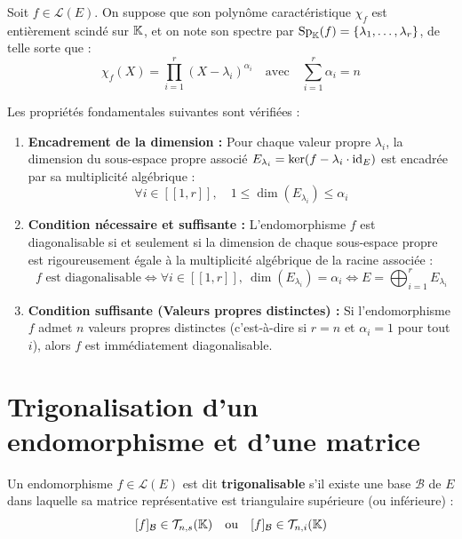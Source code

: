 \documentclass[12pt, a4paper]{report}
\begin{document}
\begin{theorem}
    Soit $f \in \mathcal{L}(E)$. On suppose que son polynôme caractéristique $\chi_f$ est entièrement scindé sur $\mathbb{K}$, et on note son spectre par $\text{Sp}_{\mathbb{K}}(f) = \{\lambda_1, \dots, \lambda_r\}$, de telle sorte que :
    $$\chi_f(X) = \prod_{i=1}^r (X - \lambda_i)^{\alpha_i} \quad \text{avec} \quad \sum_{i=1}^r \alpha_i = n$$
    
    Les propriétés fondamentales suivantes sont vérifiées :
    \begin{enumerate}
        \item \textbf{Encadrement de la dimension :} Pour chaque valeur propre $\lambda_i$, la dimension du sous-espace propre associé $E_{\lambda_i} = \ker(f - \lambda_i \cdot \mathrm{id}_E)$ est encadrée par sa multiplicité algébrique :
        $$\forall i \in [\![1,r]\!], \quad 1 \le \dim(E_{\lambda_i}) \le \alpha_i$$
        
        \item \textbf{Condition nécessaire et suffisante :} L'endomorphisme $f$ est diagonalisable si et seulement si la dimension de chaque sous-espace propre est rigoureusement égale à la multiplicité algébrique de la racine associée :
        $$f \text{ est diagonalisable} \iff \forall i \in [\![1,r]\!], \ \dim(E_{\lambda_i}) = \alpha_i \iff E = \bigoplus_{i=1}^r E_{\lambda_i}$$
        
        \item \textbf{Condition suffisante (Valeurs propres distinctes) :} Si l'endomorphisme $f$ admet $n$ valeurs propres distinctes (c'est-à-dire si $r = n$ et $\alpha_i = 1$ pour tout $i$), alors $f$ est immédiatement diagonalisable.
    \end{enumerate}
\end{theorem}

\section{Trigonalisation d'un endomorphisme et d'une matrice}

\begin{definition}[Trigonalisabilité]
    Un endomorphisme $f \in \mathcal{L}(E)$ est dit \textbf{trigonalisable} s'il existe une base $\mathcal{B}$ de $E$ dans laquelle sa matrice représentative est triangulaire supérieure (ou inférieure) :
    $$[f]_{\mathcal{B}} \in \mathcal{T}_{n,s}(\mathbb{K}) \quad \text{ou} \quad [f]_{\mathcal{B}} \in \mathcal{T}_{n,i}(\mathbb{K})$$
\end{definition}
\end{document}
